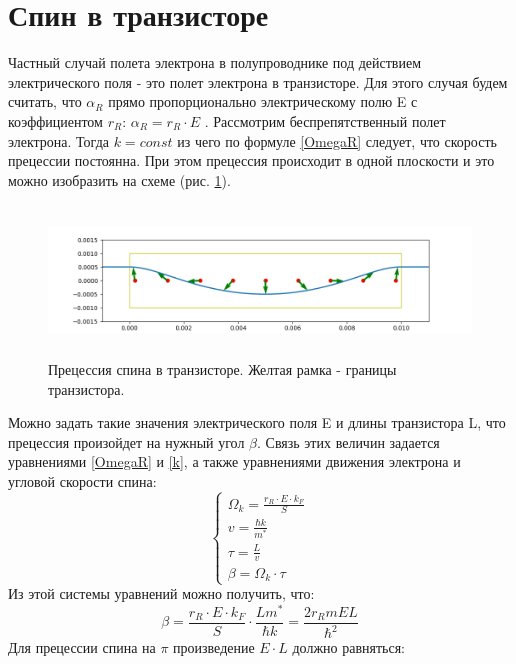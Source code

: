 \documentclass[12pt,oneside]{book}
\begin{document}
{{\section{Спин в транзисторе}
	Частный случай полета электрона в полупроводнике под действием электрического поля - это полет электрона в транзисторе.
	 Для этого случая будем считать, что  ${\alpha_R}$ прямо пропорционально электрическому полю E с коэффициентом ${r_R}$:
	${\alpha_R} = {r_R}\cdot{E}$ .
	\newline
	Рассмотрим беспрепятственный полет электрона. Тогда ${k = const}$ из чего по формуле \ref{OmegaR} следует, что скорость прецессии постоянна.
	При этом прецессия происходит в одной плоскости и это можно изобразить на схеме (рис. \ref{fig:f1}).
	\begin{figure}[h]
		\centering
		\includegraphics[width = 16cm, height = 4cm]{img/Transistor.png}
		\caption{Прецессия спина в транзисторе. Желтая рамка - границы транзистора.}
		\label{fig:f1}
	\end{figure}
	\newline
	Можно задать такие значения электрического поля E и длины транзистора L, что прецессия произойдет на нужный угол $\beta$. 
	Связь этих величин задается уравнениями \ref{OmegaR} и \ref{k}, а также уравнениями движения электрона и  угловой скорости спина:
	$$\begin{cases}
		{\Omega_k} = \frac{{{r_R}\cdot{E}}\cdot{k_F}}{S} \\
		{v} = \frac{{\hbar}k}{m^*} \\
		{\tau} = \frac{L}{v} \\
		{\beta} = {\Omega_{k}}\cdot{\tau}
	\end{cases}$$
	Из этой системы уравнений можно получить, что:
	\begin{equation}
		\label{beta}
		{\beta} = {\frac{{{r_R}\cdot{E}}\cdot{k_F}}{S}}\cdot{\frac{Lm^*}{{\hbar}k}} = \frac{2{r_R}{m}{E}{L}}{{\hbar}^2}
	\end{equation}
	\newline
	Для прецессии спина на ${\pi}$ произведение ${E}\cdot{L}$ должно равняться: 
	\begin{equation}

\end{equation}}}
\end{document}
